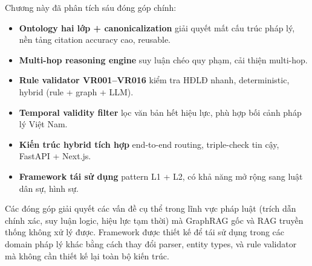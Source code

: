 \documentclass[../DoAn.tex]{subfiles}
\begin{document}
Chương này đã phân tích sáu đóng góp chính:

\begin{itemize}[nosep, leftmargin=*]
    \item \textbf{Ontology hai lớp + canonicalization} giải quyết mất cấu trúc pháp lý, nền tảng citation accuracy cao, reusable.
    
    \item \textbf{Multi-hop reasoning engine} suy luận chéo quy phạm, cải thiện multi-hop.
    
    \item \textbf{Rule validator VR001--VR016} kiểm tra HĐLĐ nhanh, deterministic, hybrid (rule + graph + LLM).
    
    \item \textbf{Temporal validity filter} lọc văn bản hết hiệu lực, phù hợp bối cảnh pháp lý Việt Nam.
    
    \item \textbf{Kiến trúc hybrid tích hợp} end-to-end routing, triple-check tin cậy, FastAPI + Next.js.
    
    \item \textbf{Framework tái sử dụng} pattern L1 + L2, có khả năng mở rộng sang luật dân sự, hình sự.
\end{itemize}

Các đóng góp giải quyết các vấn đề cụ thể trong lĩnh vực pháp luật (trích dẫn chính xác, suy luận logic, hiệu lực tạm thời) mà GraphRAG gốc và RAG truyền thống không xử lý được. Framework được thiết kế để tái sử dụng trong các domain pháp lý khác bằng cách thay đổi parser, entity types, và rule validator mà không cần thiết kế lại toàn bộ kiến trúc.
\end{document}
